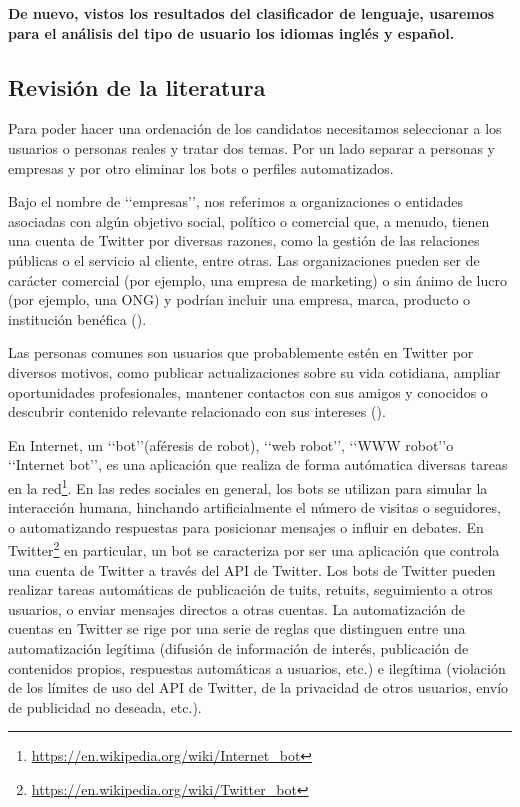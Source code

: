 {\bf De nuevo, vistos los resultados del clasificador de lenguaje, usaremos para el análisis del tipo 
de usuario los idiomas inglés y español.}

\subsection{Revisión de la literatura}

Para poder hacer una ordenación de los candidatos necesitamos seleccionar a los usuarios o personas 
reales y tratar dos temas. Por un lado separar a personas y empresas y por otro eliminar los bots 
o perfiles automatizados.

Bajo el nombre de \lq\lq empresas\rq\rq, nos referimos a organizaciones o entidades asociadas con algún objetivo social, político o comercial que, a menudo, tienen una cuenta de Twitter por diversas razones, como
la gestión de las relaciones públicas o el servicio al cliente, entre otras.
Las organizaciones pueden ser de carácter comercial (por ejemplo, una empresa de marketing) o 
sin ánimo de lucro (por ejemplo, una ONG) y podrían incluir una empresa, marca, producto o institución benéfica 
(\cite{user_class7}). 

Las personas comunes son usuarios que probablemente estén en Twitter por diversos motivos, 
como publicar actualizaciones sobre su vida cotidiana, ampliar oportunidades profesionales, 
mantener contactos con sus amigos y conocidos o descubrir contenido relevante relacionado con sus intereses
(\cite{user_class7}).

En Internet, un \lq\lq bot\rq\rq  (aféresis de robot), \lq\lq web robot\rq\rq, \lq\lq WWW robot\rq\rq o 
\lq\lq Internet bot\rq\rq, es una aplicación que realiza de forma autómatica diversas 
tareas en la red\footnote{\url{https://en.wikipedia.org/wiki/Internet_bot}}.
En las redes sociales en general, los bots se utilizan para simular la interacción humana, 
hinchando artificialmente el número de visitas o seguidores, o automatizando respuestas 
para posicionar mensajes o influir en debates.
En Twitter\footnote{\url{https://en.wikipedia.org/wiki/Twitter_bot}} en particular,
un bot se caracteriza por ser una aplicación que controla una cuenta de Twitter a través del
API de Twitter. Los bots de Twitter pueden realizar tareas automáticas de publicación de tuits,
retuits, seguimiento a otros usuarios, o enviar mensajes directos a otras cuentas. La automatización
de cuentas en Twitter se rige por una serie de reglas que distinguen entre una automatización 
legítima (difusión de información de interés, publicación de contenidos propios, respuestas automáticas
a usuarios, etc.) e ilegítima (violación de los límites de uso del API de Twitter, de la privacidad 
de otros usuarios, envío de publicidad no deseada, etc.).

